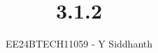\documentclass[journal]{IEEEtran}
\begin{document}
	
	
	\vspace{3cm}
	
	\title{3.1.2}
	\author{EE24BTECH11059 - Y Siddhanth}
	{\let\newpage\relax\maketitle}
	
	\renewcommand{\thefigure}{\theenumi}
	\renewcommand{\thetable}{\theenumi}
	\setlength{\intextsep}{10pt} %
	
	
	\renewcommand{\thetable}{\theenumi}
	
\end{document}
